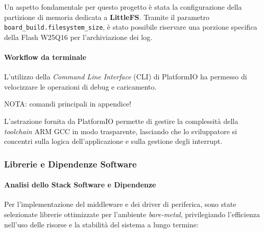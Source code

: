 Un aspetto fondamentale per questo progetto è stata la configurazione della partizione di memoria dedicata a \textbf{LittleFS}. Tramite il parametro \texttt{board\_build.filesystem\_size}, è stato possibile riservare una porzione specifica della Flash W25Q16 per l'archiviazione dei log.


\paragraph{Workflow da terminale}
L'utilizzo della \textit{Command Line Interface} (CLI) di PlatformIO ha permesso di velocizzare le operazioni di debug e caricamento.

NOTA: comandi principali in appendice!

L'astrazione fornita da PlatformIO permette di gestire la complessità della \textit{toolchain} ARM GCC in modo trasparente, lasciando che lo sviluppatore si concentri sulla logica dell'applicazione e sulla gestione degli interrupt.

\subsubsection*{Librerie e Dipendenze Software}

\paragraph{Analisi dello Stack Software e Dipendenze}
Per l'implementazione del middleware e dei driver di periferica, sono state selezionate librerie ottimizzate per l'ambiente \textit{bare-metal}, privilegiando l'efficienza nell'uso delle risorse e la stabilità del sistema a lungo termine:

